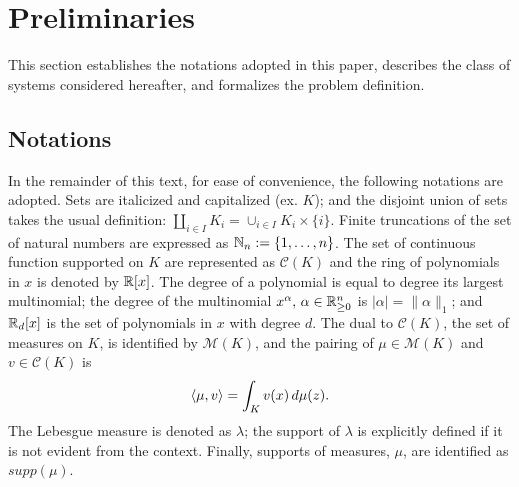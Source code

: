   \section{Preliminaries}
  This section establishes the notations adopted in this paper, describes the class of systems considered hereafter, and formalizes the problem definition.
  \subsection{Notations}
  In the remainder of this text, for ease of convenience, the following notations are adopted. Sets are italicized and capitalized (ex. $K$); and the disjoint union of sets takes the usual definition: $\coprod_{i\in I}K_i=\cup_{i\in I}K_i\times \{i\}$. Finite truncations of the set of natural numbers are expressed as \mbox{$\mathbb{N}_n:=\{1,\ldots,n\}$}. The set of continuous function supported on $K$ are represented as $\mathcal C(K)$ and the ring of polynomials in $x$ is denoted by $\mathbb{R}[x]$. The degree of a polynomial is equal to degree its largest multinomial; the degree of the multinomial $x^\alpha,\,\alpha\in \mathbb{R}_{\ge 0}^n$ is $|\alpha|=\|\alpha\|_1$; and $\mathbb{R}_d[x]$ is the set of polynomials in $x$ with degree $d$. The dual to $\mathcal C(K)$, the set of measures on $K$, is identified by $\mathcal M(K)$, and the pairing of $\mu\in \mathcal M(K)$ and $v\in \mathcal C(K)$ is
  $$\left\langle \mu,v\right\rangle=\int_{K}v(x)\,d\mu(z).$$
  The Lebesgue measure is denoted as $\lambda$; the support of $\lambda$ is explicitly defined if it is not evident from the context. Finally, supports of measures, $\mu$, are identified as $supp(\mu)$.

